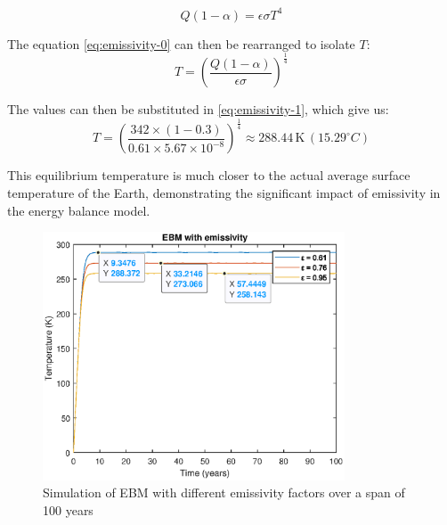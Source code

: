 \documentclass[12pt]{article}
\begin{document}
\begin{equation} \label{eq:emissivity-0}
    Q(1 - \alpha) = \epsilon\sigma T^4
\end{equation}

\noindent The equation \ref{eq:emissivity-0} can then be rearranged to isolate $T$:
\begin{equation} \label{eq:emissivity-1}
    T = \left( \frac{Q(1 - \alpha)}{\epsilon\sigma} \right)^{\frac{1}{4}}
\end{equation}

\noindent The values can then be substituted in \ref{eq:emissivity-1}, which give us:
\begin{equation}
    T = \left( \frac{342 \times (1 - 0.3)}{0.61 \times 5.67 \times 10^{-8}} \right)^{\frac{1}{4}} \approx 288.44 \, \text{K} \, ({15.29}^\circ C)
\end{equation}


This equilibrium temperature is much closer to the actual average surface temperature of the Earth, demonstrating the significant impact of emissivity
in the energy balance model.

\begin{figure}[H]
    \centering
    \includegraphics[width=0.8\textwidth]{images/ebm_emissivity_diff.eps}
    \caption{Simulation of EBM with different emissivity factors over a span of 100 years}

    \label{fig:ebm_emissivity}
\end{figure}
\end{document}
